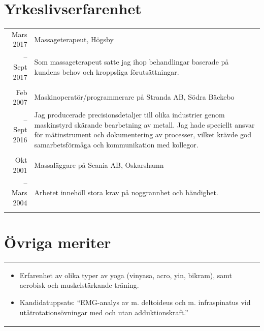 \documentclass[11pt,a4paper]{article}
\begin{document}
\section{Yrkeslivserfarenhet}
\begin{tabularx}{\textwidth}{r|X}	
	Mars 2017 & Massageterapeut, Högsby \\
	-- Sept 2017 &\footnotesize{Som massageterapeut satte jag ihop behandlingar baserade på kundens behov och kroppsliga förutsättningar. }\\
	\multicolumn{2}{c}{} \\

	Feb 2007 & Maskinoperatör/programmerare på Stranda AB, Södra Bäckebo \\
	-- Sept 2016&\footnotesize{Jag producerade precisionsdetaljer till olika industrier genom maskinstyrd skärande bearbetning av metall. Jag hade speciellt ansvar för mätinstrument och dokumentering av processer, vilket krävde god samarbetsförmåga och kommunikation med kollegor.}\\
	\multicolumn{2}{c}{} \\
	
	Okt 2001& Massaläggare på Scania AB, Oskarshamn \\
	-- Mars 2004&\footnotesize{Arbetet innehöll stora krav på noggrannhet och händighet.}\\
	\multicolumn{2}{c}{} \\

\end{tabularx}

\section{Övriga meriter}
\begin{tabularx}{\textwidth}{X}
	\vspace{-7pt}
\begin{itemize}[leftmargin=0.8em] 
	\item Erfarenhet av olika typer av yoga (vinyasa, acro, yin, bikram), samt aerobisk och muskelstärkande träning.
	\item Kandidatuppsats: ``EMG-analys av m. deltoideus och m. infraspinatus vid utåt\-rotations\-övningar med och utan adduktionskraft.''
\end{itemize}
\end{tabularx}

\end{document}

